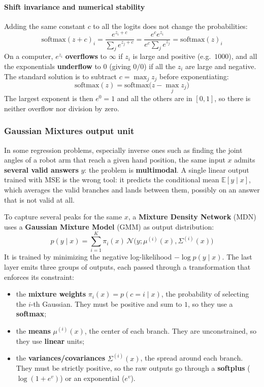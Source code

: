 \paragraph{Shift invariance and numerical stability}
Adding the same constant $c$ to all the logits does not change the probabilities:
\begin{equation*}
    \text{softmax}(z + c)_i = \frac{e^{z_i + c}}{\sum_j e^{z_j + c}} = \frac{e^c e^{z_i}}{e^c \sum_j e^{z_j}} = \text{softmax}(z)_i
\end{equation*}
On a computer, $e^{z_i}$ \textbf{overflows} to $\infty$ if $z_i$ is large and
positive (e.g.\ $1000$), and all the exponentials \textbf{underflow} to $0$ (giving
$0/0$) if all the $z_i$ are large and negative. The standard solution is to subtract
$c = \max_j z_j$ before exponentiating:
\begin{equation}
    \text{softmax}(z) = \text{softmax}\big(z - \max_j z_j\big)
\end{equation}
The largest exponent is then $e^0 = 1$ and all the others are in $[0, 1]$, so there
is neither overflow nor division by zero.

\subsubsection{Gaussian Mixtures output unit}
In some regression problems, especially inverse ones such as finding the joint
angles of a robot arm that reach a given hand position, the same input $x$ admits
\textbf{several valid answers} $y$: the problem is \textbf{multimodal}. A single
linear output trained with MSE is the wrong tool: it predicts the conditional mean
$\mathbb{E}[y \mid x]$, which averages the valid branches and lands between them,
possibly on an answer that is not valid at all.

To capture several peaks for the same $x$, a \textbf{Mixture Density Network} (MDN)
uses a \textbf{Gaussian Mixture Model} (GMM) as output distribution:
\begin{equation}
    p(y \mid x) = \sum_{i=1}^K \pi_i(x) \, \mathcal{N}\big(y; \mu^{(i)}(x), \Sigma^{(i)}(x)\big)
\end{equation}
It is trained by minimizing the negative log-likelihood $-\log p(y \mid x)$. The
last layer emits three groups of outputs, each passed through a transformation that
enforces its constraint:
\begin{itemize}
    \item the \textbf{mixture weights} $\pi_i(x) = p(c=i \mid x)$, the probability of
          selecting the $i$-th Gaussian. They must be positive and sum to $1$, so
          they use a \textbf{softmax};
    \item the \textbf{means} $\mu^{(i)}(x)$, the center of each branch. They are
          unconstrained, so they use \textbf{linear} units;
    \item the \textbf{variances/covariances} $\Sigma^{(i)}(x)$, the spread around each
          branch. They must be strictly positive, so the raw outputs go through a
          \textbf{softplus} ($\log(1+e^v)$) or an exponential ($e^v$).
\end{itemize}

